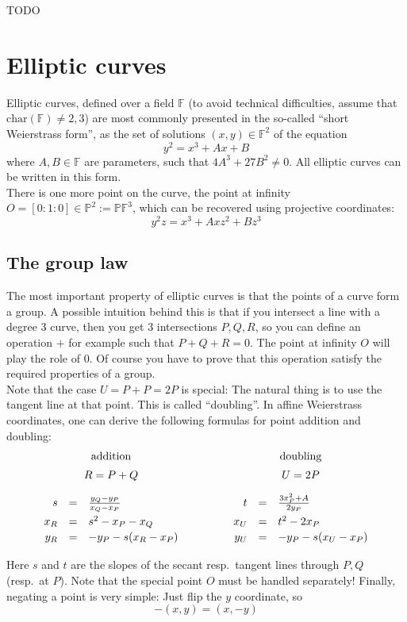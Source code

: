 \documentclass[12pt,draft,a4paper,openany,oneside]{amsbook}
\def\qquad{\quad\quad}
\def\F{\mathbb{F}}
\def\P{\mathbb{P}}
\theoremstyle{plain}
\theoremstyle{definition}
\begin{document}
TODO


\chapter{Elliptic curves}

Elliptic curves, defined over a field $\F$ (to avoid technical difficulties, assume that $\mathrm{char}(\F)\neq 2,3$)
are most commonly presented in the so-called ``short Weierstrass form'',
as the set of solutions $(x,y)\in\F^2$ of the equation
\[ y^2 = x^3 + Ax + B \]
where $A,B\in\F$ are parameters, such that $4 A^3 + 27 B^2 \neq 0$. 
All elliptic curves can be written in this form.\\

There is one more point on the curve, the point at infinity $O=[0:1:0]\in\P^2:=\P\F^3$,
which can be recovered using projective coordinates:
\[ y^2z = x^3 + Axz^2 + Bz^3 \]

\section{The group law}

The most important property of elliptic curves is that the points of a curve form a group.
A possible intuition behind this is that if you intersect a line with a degree 3 curve,
then you get 3 intersections $P,Q,R$, so you can define an operation $+$ for example
such that $P+Q+R=0$. The point at infinity $O$ will play the role of $0$. Of course
you have to prove that this operation satisfy the required properties of a group.\\

Note that the case $U=P+P=2P$ is special: The natural thing is to use the tangent line at
that point. This is called ``doubling''. In affine Weierstrass coordinates, one can
derive the following formulas for point addition and doubling:\\
\[
\begin{array}{rclcrcl}
\multicolumn{3}{c}{\textrm{addition}} &
\multicolumn{1}{c}{\qquad} &
\multicolumn{3}{c}{\textrm{doubling}} \\[5pt]
\multicolumn{3}{c}{R=P+Q}  &
\multicolumn{1}{c}{\qquad} &
\multicolumn{3}{c}{U=2P}   \\[10pt]
 s   &=& \frac{y_Q-y_P}{x_Q-x_P}  & \quad\quad\quad &  t   &=& \frac{3x_P^2+A}{2 y_P}  \\[5pt]
 x_R &=&  s^2 - x_P - x_Q         & \quad\quad\quad &  x_U &=&  t^2 - 2x_P             \\[2pt]
 y_R &=& -y_P - s(x_R - x_P)      & \quad\quad\quad &  y_U &=& - y_P - s(x_U - x_P)    \\[5pt]
\end{array}
\]
Here $s$ and $t$ are the slopes of the secant resp.~tangent lines through $P,Q$
(resp.~at $P$). Note that the special point $O$ must be handled separately!
Finally, negating a point is very simple: Just flip the $y$ coordinate, so 
\[ -(x,y) = (x,-y) \]
\end{document}
